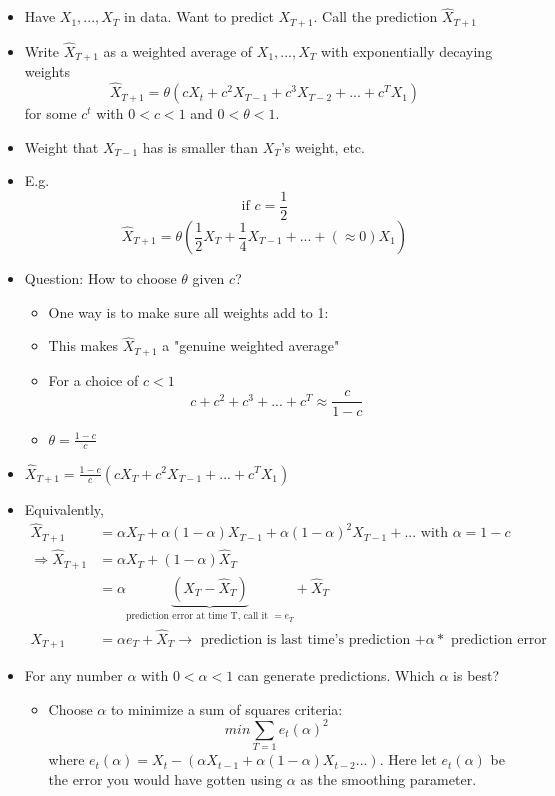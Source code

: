 \begin{itemize}
    \item[] Have $X_1,...,X_T$ in data. Want to predict $X_{T+1}$. Call the prediction $\hat{X}_{T+1}$
    \item[] Write $\hat{X}_{T+1} $ as a weighted average of $X_1,...,X_T$ with exponentially decaying weights \[
    \hat{X}_{T+1} = \theta(cX_t+c^2X_{T-1} + c^3X_{T-2}+...+c^TX_1)
    \] for some $c^t$ with $0<c<1$ and $0<\theta<1$.
    \item[] Weight that $X_{T-1}$ has is smaller than $X_T$'s weight, etc.
    \item[] E.g. \[\text{if } c=\frac{1}{2} \]
    \[\hat{X}_{T+1}=\theta \left(\frac{1}{2}X_T+\frac{1}{4} X_{T-1}+...+(\approx0) X_1 \right)
    \]
    \item[] Question: How to choose $\theta$ given $c$?
    \begin{itemize}
        \item[] One way is to make sure all weights add to 1:
        \item[] This makes $\hat{X}_{T+1}$ a "genuine weighted average"
        \item[] For a choice of $c<1$
        \[
        c+c^2+c^3+...+c^T\approx \frac{c}{1-c}
        \]
        \item[] $\theta=\frac{1-c}{c}$ 
    \end{itemize}
    \item $\hat{X}_{T+1} = \frac{1-c}{c}(cX_T+c^2X_{T-1}+...+c^TX_1) $
    \item Equivalently,
    \begin{align*}
        \hat{X}_{T+1}&= \alpha X_T+\alpha(1-\alpha)X_{T-1}+\alpha(1-\alpha)^2 X_{T-1}+... \text{ with }\alpha=1-c \\
        \Rightarrow \hat{X}_{T+1}&=\alpha X_T+(1-\alpha)\hat{X}_T \\ &=\alpha\underbrace{(X_T-\hat{X}_T)}_\text{prediction error at time T, call it $= e_T$}+\hat{X}_T \\
        X_{T+1}&=\alpha e_T + \hat{X}_T \rightarrow \text{ prediction is last time's prediction $+ \alpha *$ prediction error}
    \end{align*}
    \item For any number $\alpha$ with $0<\alpha<1$ can generate predictions. Which $\alpha$ is best?
    \begin{itemize}
        \item Choose $\alpha$ to minimize a sum of squares criteria: \[min \sum_{T=1}e_t (\alpha)^2\] where $e_t(\alpha)=X_t-(\alpha X_{t-1}+ \alpha(1-\alpha)X_{t-2} ...) $. Here let $e_t(\alpha)$ be the error you would have gotten using $\alpha$ as the smoothing parameter.

\end{itemize}
\end{itemize}
